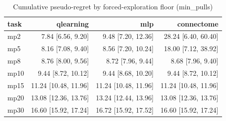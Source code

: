 \begin{table}[t]
\centering
\small
\begin{tabular}{lrrr}
\toprule
task & qlearning & mlp & connectome \\
\midrule
mp2 & 7.84 [6.56, 9.20] & 9.48 [7.20, 12.36] & 28.24 [6.40, 60.40] \\
mp5 & 8.16 [7.08, 9.40] & 8.56 [7.20, 10.24] & 18.00 [7.12, 38.92] \\
mp8 & 8.76 [8.00, 9.56] & 8.72 [7.96, 9.44] & 8.68 [7.96, 9.40] \\
mp10 & 9.44 [8.72, 10.12] & 9.44 [8.68, 10.20] & 9.44 [8.72, 10.12] \\
mp15 & 11.24 [10.48, 11.96] & 11.24 [10.48, 11.96] & 11.24 [10.48, 11.96] \\
mp20 & 13.08 [12.36, 13.76] & 13.24 [12.44, 13.96] & 13.08 [12.36, 13.76] \\
mp30 & 16.60 [15.92, 17.24] & 16.72 [15.92, 17.52] & 16.60 [15.92, 17.24] \\
\bottomrule
\end{tabular}
\caption{Cumulative pseudo-regret by forced-exploration floor (min\_pulls)}
\label{tab:bandit_sweep}
\end{table}